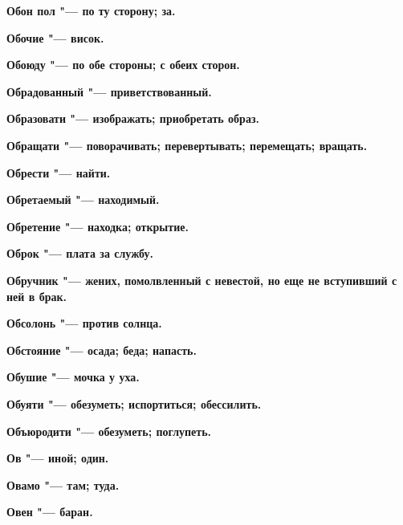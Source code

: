 \begin{mymulticols}{2}
\bfseries Обон пол\normalfont{} "--- по ту сторону; за. 




\bfseries Обочие\normalfont{} "--- висок. 




\bfseries Обоюду\normalfont{} "--- по обе стороны; с обеих сторон. 




\bfseries Обрадованный\normalfont{} "--- приветствованный. 




\bfseries Образовати\normalfont{} "--- изображать; приобретать образ. 




\bfseries Обращати\normalfont{} "--- поворачивать; перевертывать; перемещать; вращать. 




\bfseries Обрести\normalfont{} "--- найти. 




\bfseries Обретаемый\normalfont{} "--- находимый. 




\bfseries Обретение\normalfont{} "--- находка; открытие. 




\bfseries Оброк\normalfont{} "--- плата за службу. 




\bfseries Обручник\normalfont{} "--- жених, помолвленный с невестой, но еще не вступивший с ней в брак. 




\bfseries Обсолонь\normalfont{} "--- против солнца. 




\bfseries Обстояние\normalfont{} "--- осада; беда; напасть. 




\bfseries Обушие\normalfont{} "--- мочка у уха. 




\bfseries Обуяти\normalfont{} "--- обезуметь; испортиться; обессилить. 




\bfseries Объюродити\normalfont{} "--- обезуметь; поглупеть. 




\bfseries Ов\normalfont{} "--- иной; один. 




\bfseries Овамо\normalfont{} "--- там; туда. 




\bfseries Овен\normalfont{} "--- баран. 





\end{mymulticols}
